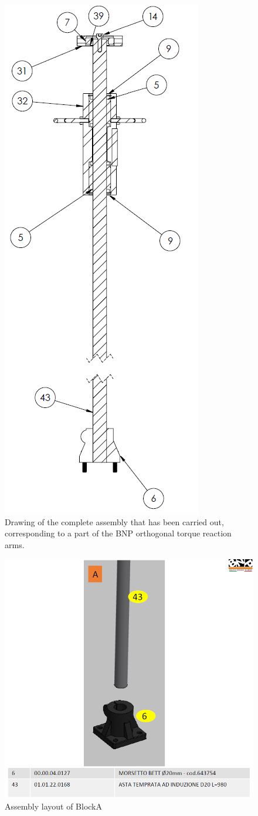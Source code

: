 \begin{figure} [!htbp]
\centering
\includegraphics[width=0.25
\textwidth]{figures/Magistrale/BRF_draw}
\caption[Final Assembly Sketch]{Drawing of the complete assembly that has been carried out, corresponding to a part of the BNP orthogonal torque reaction arms.
\label{fig:brf_draw}}
\end{figure} 

\begin{figure} [!htbp]
\centering
\includegraphics[width=0.6
\textwidth]{figures/Magistrale/ass_obj_1}
\caption[BlockA Assembly]{Assembly layout of BlockA
\label{fig:ass_obj_1}}
\end{figure} 

